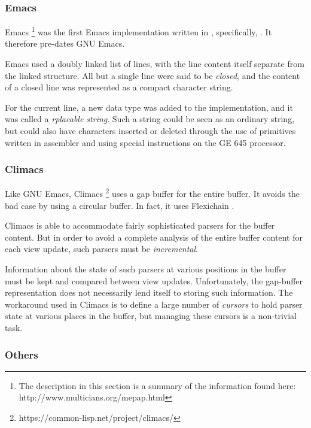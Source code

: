 \subsubsection{\multics{} Emacs}

\multics{} Emacs%
\footnote{The description in this section is a summary of the
  information found here: http://www.multicians.org/mepap.html}
\cite{Greenberg:1980:MEC:800087.802784}
was the first Emacs implementation written in \lisp{}, specifically,
\multics{} \maclisp{}.  It therefore pre-dates GNU Emacs.

\multics{} Emacs used a doubly linked list of lines, with the line
content itself separate from the linked structure.  All but a single
line were said to be \emph{closed}, and the content of a closed line
was represented as a compact character string.

For the current line, a new \maclisp{} data type was added to the
\multics{} \maclisp{} implementation, and it was called a
\emph{rplacable string}.  Such a string could be seen as an ordinary
\maclisp{} string, but could also have characters inserted or deleted
through the use of primitives written in assembler and using special
instructions on the GE 645 processor.

\subsubsection{Climacs}

Like GNU Emacs, Climacs%
\footnote{https://common-lisp.net/project/climacs/}
uses a gap buffer for the entire buffer.  It
avoids the bad case by using a circular buffer.  In fact, it uses
Flexichain \cite{flexichain}.

Climacs is able to accommodate fairly sophisticated parsers for the
buffer content.  But in order to avoid a complete analysis of the
entire buffer content for each view update, such parsers must be
\emph{incremental}.

Information about the state of such parsers at various positions in
the buffer must be kept and compared between view updates.
Unfortunately, the gap-buffer representation does not necessarily lend
itself to storing such information.  The workaround used in Climacs is
to define a large number of \emph{cursors} to hold parser state at
various places in the buffer, but managing these cursors is a
non-trivial task.

\subsubsection{Others}

